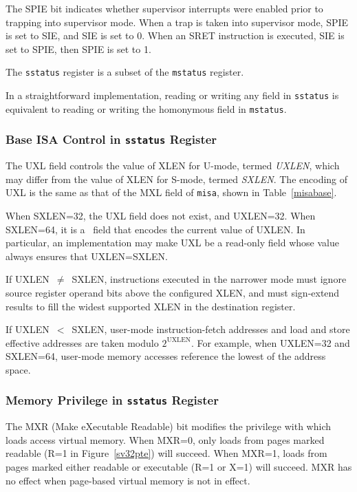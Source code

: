 The SPIE bit indicates whether supervisor interrupts were enabled prior to
trapping into supervisor mode.  When a trap is taken into supervisor
mode, SPIE is set to SIE, and SIE is set to 0.  When an SRET instruction is
executed, SIE is set to SPIE, then SPIE is set to 1.

The {\tt sstatus} register is a subset of the {\tt mstatus} register.

\begin{commentary}
In a straightforward implementation, reading or writing any field in
{\tt sstatus} is equivalent to reading or writing the homonymous field
in {\tt mstatus}.
\end{commentary}

\subsubsection{Base ISA Control in {\tt sstatus} Register}

The UXL field controls the value of XLEN for U-mode, termed {\em UXLEN},
which may differ from the value of XLEN for S-mode, termed {\em SXLEN}.  The
encoding of UXL is the same as that of the MXL field of {\tt misa}, shown in
Table~\ref{misabase}.

When SXLEN=32, the UXL field does not exist, and UXLEN=32.  When
SXLEN=64, it is a \warl\ field that encodes the current value of UXLEN.
In particular, an implementation may make UXL be a read-only field whose
value always ensures that UXLEN=SXLEN.

If UXLEN~$\ne$~SXLEN, instructions executed in the narrower mode must ignore
source register operand bits above the configured XLEN, and must sign-extend
results to fill the widest supported XLEN in the destination register.

If UXLEN~$<$~SXLEN, user-mode instruction-fetch addresses and load and store
effective addresses are taken modulo $2^{\text{UXLEN}}$.  For example, when UXLEN=32
and SXLEN=64, user-mode memory accesses reference the lowest 
of the address space.

\subsubsection{Memory Privilege in {\tt sstatus} Register}
\label{sec:sum}

The MXR (Make eXecutable Readable) bit modifies the privilege with which loads
access virtual memory.  When MXR=0, only loads from pages marked readable (R=1
in Figure~\ref{sv32pte}) will succeed.  When MXR=1, loads from pages marked
either readable or executable (R=1 or X=1) will succeed.  MXR has no effect
when page-based virtual memory is not in effect.

